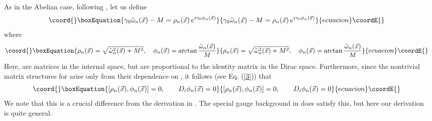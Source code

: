 \documentclass[a4paper,12pt]{article}
\begin{document}
As in the Abelian case, following \cite{fosco:1997ei,fosco:1997vu},
let us define
\begin{equation}\coord{}\boxEquation{
\gamma_{0}\tilde{\omega}_{n}(\vec{x}) - M =
\rho_{n}(\vec{x})\,e^{i\gamma_{0}\phi_{n}(\vec{x})}\label{12}
}{
\gamma_{0}\tilde{\omega}_{n}(\vec{x}) - M =
\rho_{n}(\vec{x})\,e^{i\gamma_{0}\phi_{n}(\vec{x})}}{ecuacion}\coordE{}\end{equation}
where
\begin{equation}\coord{}\boxEquation{
\rho_{n}(\vec{x}) = \sqrt{\tilde{\omega}_{n}^{2}(\vec{x}) +
  M^{2}},\quad \phi_{n}(\vec{x}) = \arctan
  {\tilde{\omega}_{n}(\vec{x})\over M}\label{13}
}{
\rho_{n}(\vec{x}) = \sqrt{\tilde{\omega}_{n}^{2}(\vec{x}) +
  M^{2}},\quad \phi_{n}(\vec{x}) = \arctan
  {\tilde{\omega}_{n}(\vec{x})\over M}}{ecuacion}\coordE{}\end{equation}
Here, \coordHE{} are matrices in the internal space, but are
proportional to the identity matrix in the Dirac space. Furthermore,
since the nontrivial matrix structures for
\coordHE{} arise  only from their
dependence on \coordHE{}, it follows (see Eq. (\ref{3})) that
\begin{equation}\coord{}\boxEquation{
\left[\rho_{n}(\vec{x}),\phi_{n}(\vec{x})\right] = 0,\qquad
D_{i}\phi_{n}(\vec{x}) = 0\label{14}
}{
\left[\rho_{n}(\vec{x}),\phi_{n}(\vec{x})\right] = 0,\qquad
D_{i}\phi_{n}(\vec{x}) = 0}{ecuacion}\coordE{}\end{equation}
We note that this is a crucial difference from the derivation in
\cite{fosco:1997vu}.
The special gauge background in \cite{fosco:1997vu}
does satisfy this, but here our derivation is quite general.
\end{document}
